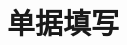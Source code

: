 \documentclass[16pt]{article}
\begin{document}

\section{单据填写}                                                                                                                                                                                                                                                                                                                                         
\end{document}

